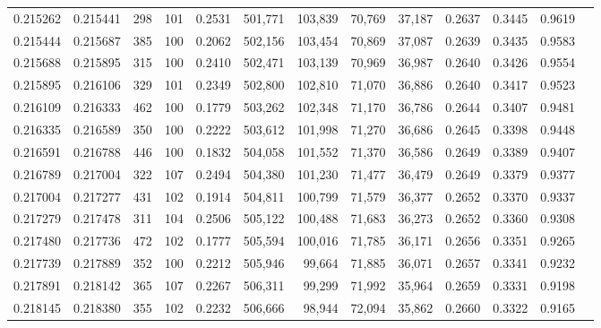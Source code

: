\begin{tabular}{rrrrrrrrrrrrr}
0.215262 & 0.215441 &   298 & 101 &                                     0.2531 & 501,771 & 103,839 &  70,769 &  37,187 & 0.2637 & 0.3445 & 0.9619 \\
0.215444 & 0.215687 &   385 & 100 &                                     0.2062 & 502,156 & 103,454 &  70,869 &  37,087 & 0.2639 & 0.3435 & 0.9583 \\
0.215688 & 0.215895 &   315 & 100 &                                     0.2410 & 502,471 & 103,139 &  70,969 &  36,987 & 0.2640 & 0.3426 & 0.9554 \\
0.215895 & 0.216106 &   329 & 101 &                                     0.2349 & 502,800 & 102,810 &  71,070 &  36,886 & 0.2640 & 0.3417 & 0.9523 \\
0.216109 & 0.216333 &   462 & 100 &                                     0.1779 & 503,262 & 102,348 &  71,170 &  36,786 & 0.2644 & 0.3407 & 0.9481 \\
0.216335 & 0.216589 &   350 & 100 &                                     0.2222 & 503,612 & 101,998 &  71,270 &  36,686 & 0.2645 & 0.3398 & 0.9448 \\
0.216591 & 0.216788 &   446 & 100 &                                     0.1832 & 504,058 & 101,552 &  71,370 &  36,586 & 0.2649 & 0.3389 & 0.9407 \\
0.216789 & 0.217004 &   322 & 107 &                                     0.2494 & 504,380 & 101,230 &  71,477 &  36,479 & 0.2649 & 0.3379 & 0.9377 \\
0.217004 & 0.217277 &   431 & 102 &                                     0.1914 & 504,811 & 100,799 &  71,579 &  36,377 & 0.2652 & 0.3370 & 0.9337 \\
0.217279 & 0.217478 &   311 & 104 &                                     0.2506 & 505,122 & 100,488 &  71,683 &  36,273 & 0.2652 & 0.3360 & 0.9308 \\
0.217480 & 0.217736 &   472 & 102 &                                     0.1777 & 505,594 & 100,016 &  71,785 &  36,171 & 0.2656 & 0.3351 & 0.9265 \\
0.217739 & 0.217889 &   352 & 100 &                                     0.2212 & 505,946 &  99,664 &  71,885 &  36,071 & 0.2657 & 0.3341 & 0.9232 \\
0.217891 & 0.218142 &   365 & 107 &                                     0.2267 & 506,311 &  99,299 &  71,992 &  35,964 & 0.2659 & 0.3331 & 0.9198 \\
0.218145 & 0.218380 &   355 & 102 &                                     0.2232 & 506,666 &  98,944 &  72,094 &  35,862 & 0.2660 & 0.3322 & 0.9165 \\

\end{tabular}
